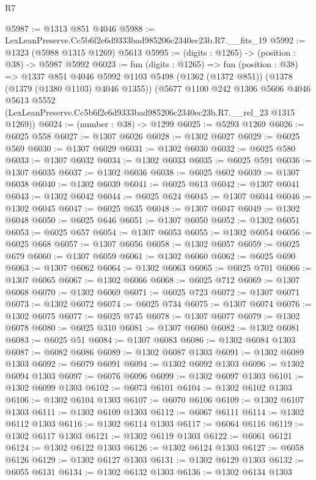 \begin{lexlean}{R7}
\begin{coremodule}
@5987 := @1313 @851 @4046
@5988 := LexLeanPreserve.Cc5b6f2e6d9333bad985206c2340ec23b.R7.__fits_19
@5992 := @1323 (@5988 @1315 @1269) @5613
@5995 := (digits : @1265) -> (position : @38) -> @5987 @5992
@6023 := fun (digits : @1265) =>
  fun (position : @38) =>
  @1337
    @851
    @4046
    @5992
    @1103
    @5498
    (@1362 (@1372 @851))
    (@1378 (@1379 (@1380 @1103) @4046 @1355))
    (@5677
      @1100
      @242
      @1306
      @5606
      @4046
      @5613
      @5552
      (LexLeanPreserve.Cc5b6f2e6d9333bad985206c2340ec23b.R7.__rel_23 @1315 @1269))
@6024 := (number : @38) -> @1299
@6025 := @5293 @1269
@6026 := @6025 @558
@6027 := @1307 @6026
@6028 := @1302 @6027
@6029 := @6025 @569
@6030 := @1307 @6029
@6031 := @1302 @6030
@6032 := @6025 @580
@6033 := @1307 @6032
@6034 := @1302 @6033
@6035 := @6025 @591
@6036 := @1307 @6035
@6037 := @1302 @6036
@6038 := @6025 @602
@6039 := @1307 @6038
@6040 := @1302 @6039
@6041 := @6025 @613
@6042 := @1307 @6041
@6043 := @1302 @6042
@6044 := @6025 @624
@6045 := @1307 @6044
@6046 := @1302 @6045
@6047 := @6025 @635
@6048 := @1307 @6047
@6049 := @1302 @6048
@6050 := @6025 @646
@6051 := @1307 @6050
@6052 := @1302 @6051
@6053 := @6025 @657
@6054 := @1307 @6053
@6055 := @1302 @6054
@6056 := @6025 @668
@6057 := @1307 @6056
@6058 := @1302 @6057
@6059 := @6025 @679
@6060 := @1307 @6059
@6061 := @1302 @6060
@6062 := @6025 @690
@6063 := @1307 @6062
@6064 := @1302 @6063
@6065 := @6025 @701
@6066 := @1307 @6065
@6067 := @1302 @6066
@6068 := @6025 @712
@6069 := @1307 @6068
@6070 := @1302 @6069
@6071 := @6025 @723
@6072 := @1307 @6071
@6073 := @1302 @6072
@6074 := @6025 @734
@6075 := @1307 @6074
@6076 := @1302 @6075
@6077 := @6025 @745
@6078 := @1307 @6077
@6079 := @1302 @6078
@6080 := @6025 @310
@6081 := @1307 @6080
@6082 := @1302 @6081
@6083 := @6025 @51
@6084 := @1307 @6083
@6086 := @1302 @6084 @1303
@6087 := @6082 @6086
@6089 := @1302 @6087 @1303
@6091 := @1302 @6089 @1303
@6092 := @6079 @6091
@6094 := @1302 @6092 @1303
@6096 := @1302 @6094 @1303
@6097 := @6076 @6096
@6099 := @1302 @6097 @1303
@6101 := @1302 @6099 @1303
@6102 := @6073 @6101
@6104 := @1302 @6102 @1303
@6106 := @1302 @6104 @1303
@6107 := @6070 @6106
@6109 := @1302 @6107 @1303
@6111 := @1302 @6109 @1303
@6112 := @6067 @6111
@6114 := @1302 @6112 @1303
@6116 := @1302 @6114 @1303
@6117 := @6064 @6116
@6119 := @1302 @6117 @1303
@6121 := @1302 @6119 @1303
@6122 := @6061 @6121
@6124 := @1302 @6122 @1303
@6126 := @1302 @6124 @1303
@6127 := @6058 @6126
@6129 := @1302 @6127 @1303
@6131 := @1302 @6129 @1303
@6132 := @6055 @6131
@6134 := @1302 @6132 @1303
@6136 := @1302 @6134 @1303

\end{coremodule}
\end{lexlean}
